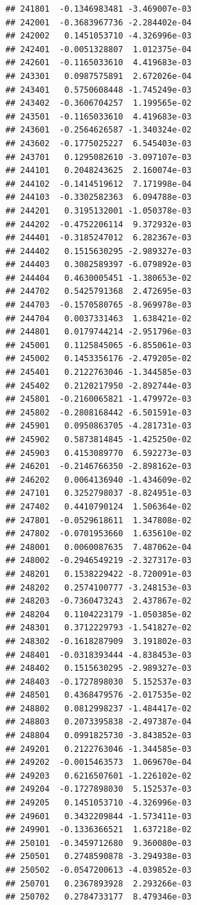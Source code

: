 \documentclass[ignorenonframetext,]{beamer}
\begin{document}
\begin{frame}[fragile]
\begin{verbatim}
## 241801  -0.1346983481 -3.469007e-03
## 242001  -0.3683967736 -2.284402e-04
## 242002   0.1451053710 -4.326996e-03
## 242401  -0.0051328807  1.012375e-04
## 242601  -0.1165033610  4.419683e-03
## 243301   0.0987575891  2.672026e-04
## 243401   0.5750608448 -1.745249e-03
## 243402  -0.3606704257  1.199565e-02
## 243501  -0.1165033610  4.419683e-03
## 243601  -0.2564626587 -1.340324e-02
## 243602  -0.1775025227  6.545403e-03
## 243701   0.1295082610 -3.097107e-03
## 244101   0.2048243625  2.160074e-03
## 244102  -0.1414519612  7.171998e-04
## 244103  -0.3302582363  6.094788e-03
## 244201   0.3195132001 -1.050378e-03
## 244202  -0.4752206114  9.372932e-03
## 244401  -0.3185247012  6.282367e-03
## 244402   0.1515630295 -2.989327e-03
## 244403   0.3082589397 -6.079892e-03
## 244404   0.4630005451 -1.380653e-02
## 244702   0.5425791368  2.472695e-03
## 244703  -0.1570580765 -8.969978e-03
## 244704   0.0037331463  1.638421e-02
## 244801   0.0179744214 -2.951796e-03
## 245001   0.1125845065 -6.855061e-03
## 245002   0.1453356176 -2.479205e-02
## 245401   0.2122763046 -1.344585e-03
## 245402   0.2120217950 -2.892744e-03
## 245801  -0.2160065821 -1.479972e-03
## 245802  -0.2808168442 -6.501591e-03
## 245901   0.0950863705 -4.281731e-03
## 245902   0.5873814845 -1.425250e-02
## 245903   0.4153089770  6.592273e-03
## 246201  -0.2146766350 -2.898162e-03
## 246202   0.0064136940 -1.434609e-02
## 247101   0.3252798037 -8.824951e-03
## 247402   0.4410790124  1.506364e-02
## 247801  -0.0529618611  1.347808e-02
## 247802  -0.0701953660  1.635610e-02
## 248001   0.0060087635  7.487062e-04
## 248002  -0.2946549219 -2.327317e-03
## 248201   0.1538229422 -8.720091e-03
## 248202   0.2574100777 -3.248153e-03
## 248203  -0.7360473243  2.437867e-02
## 248204   0.1104223179 -1.050385e-02
## 248301   0.3712229793 -1.541827e-02
## 248302  -0.1618287909  3.191802e-03
## 248401  -0.0318393444 -4.838453e-03
## 248402   0.1515630295 -2.989327e-03
## 248403  -0.1727898030  5.152537e-03
## 248501   0.4368479576 -2.017535e-02
## 248802   0.0812998237 -1.484417e-02
## 248803   0.2073395838 -2.497387e-04
## 248804   0.0991825730 -3.843852e-03
## 249201   0.2122763046 -1.344585e-03
## 249202  -0.0015463573  1.069670e-04
## 249203   0.6216507601 -1.226102e-02
## 249204  -0.1727898030  5.152537e-03
## 249205   0.1451053710 -4.326996e-03
## 249601   0.3432209844 -1.573411e-03
## 249901  -0.1336366521  1.637218e-02
## 250101  -0.3459712680  9.360080e-03
## 250501   0.2748590878 -3.294938e-03
## 250502  -0.0547200613 -4.039852e-03
## 250701   0.2367893928  2.293266e-03
## 250702   0.2784733177  8.479346e-03

\end{verbatim}
\end{frame}
\end{document}
